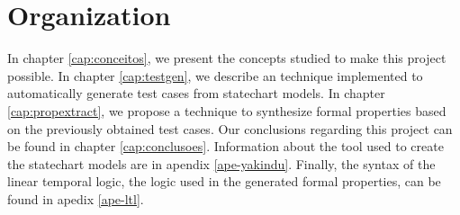 \section{Organization}

In chapter \ref{cap:conceitos}, we present the concepts studied to make this project possible. In chapter \ref{cap:testgen}, we describe an technique implemented to automatically generate test cases from statechart models. In chapter \ref{cap:propextract}, we propose a technique to synthesize formal properties based on the previously obtained test cases. Our conclusions regarding this project can be found in chapter \ref{cap:conclusoes}. Information about the tool used to create the statechart models are in apendix \ref{ape-yakindu}. Finally, the syntax of the linear temporal logic, the logic used in the generated formal properties, can be found in apedix \ref{ape-ltl}.
